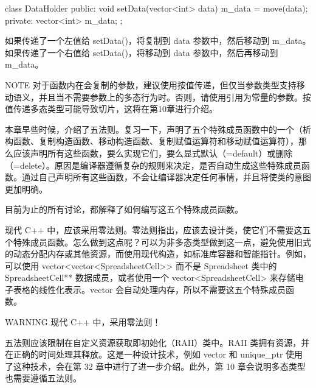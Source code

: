 \begin{cpp}
class DataHolder
{
    public:
        void setData(vector<int> data) { m_data = move(data); }
    private:
        vector<int> m_data;
};
\end{cpp}

如果传递了一个左值给 setData()，将复制到 data 参数中，然后移动到 m\_data。如果传递了一个右值给 setData()，将移动到 data 参数中，然后再移动到 m\_data。

\begin{myNotic}{NOTE}
对于函数内在会复制的参数，建议使用按值传递，但仅当参数类型支持移动语义，并且当不需要参数上的多态行为时。否则，请使用引用为常量的参数。按值传递多态类型可能导致切片，这将在第10章进行介绍。
\end{myNotic}


本章早些时候，介绍了五法则。复习一下，声明了五个特殊成员函数中的一个（析构函数、复制构造函数、移动构造函数、复制赋值运算符和移动赋值运算符），那么应该声明所有这些函数，要么实现它们，要么显式默认（=default）或删除（=delete）。原因是编译器遵循复杂的规则来决定，是否自动生成这些特殊成员函数。通过自己声明所有这些函数，不会让编译器决定任何事情，并且将使类的意图更加明确。

目前为止的所有讨论，都解释了如何编写这五个特殊成员函数。

现代 C++ 中，应该采用零法则。零法则指出，应该去设计类，使它们不需要这五个特殊成员函数。怎么做到这点呢？可以为非多态类型做到这一点，避免使用旧式的动态分配内存或其他资源，而使用现代构造，如标准库容器和智能指针。例如，可以使用 vector<vector<SpreadsheetCell>{}> 而不是 Spreadsheet 类中的 SpreadsheetCell** 数据成员，或者使用一个 vector<SpreadsheetCell> 来存储电子表格的线性化表示。vector 会自动处理内存，所以不需要这五个特殊成员函数。

\begin{myWarning}{WARNING}
现代 C++ 中，采用零法则！
\end{myWarning}

五法则应该限制在自定义资源获取即初始化（RAII）类中。RAII 类拥有资源，并在正确的时间处理其释放。这是一种设计技术，例如 vector 和 unique\_ptr 使用了这种技术，会在第 32 章中进行了进一步介绍。此外，第 10 章会说明多态类型也需要遵循五法则。










